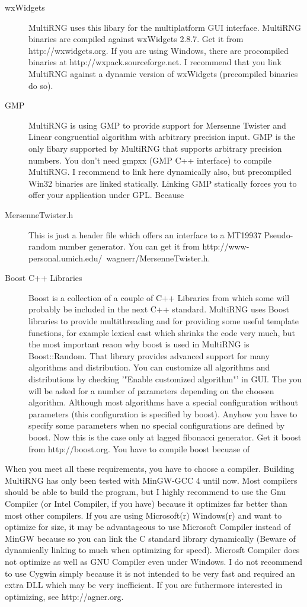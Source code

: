 \documentclass{scrartcl}
\begin{document}
\begin{description}
\item[wxWidgets]MultiRNG uses this libary for the multiplatform GUI interface. MultiRNG binaries are compiled against wxWidgets 2.8.7. Get it from http://wxwidgets.org. If you are using Windows, there are procompiled binaries at http://wxpack.sourceforge.net. I recommend that you link MultiRNG against a dynamic version of wxWidgets (precompiled binaries do so).
\item[GMP]MultiRNG is using GMP to provide support for Mersenne Twister and Linear congruential algorithm with arbitrary precision input. GMP is the only libary supported by MultiRNG that supports arbitrary precision numbers. You don't need gmpxx (GMP C++ interface) to compile MultiRNG. I recommend to link here dynamically also, but precompiled Win32 binaries are linked statically. Linking GMP statically forces you to offer your application under GPL. Because 
\item[MersenneTwister.h]This is just a header file which offers an interface to a MT19937 Pseudo-random number generator. You can get it from http://www-personal.umich.edu/~wagnerr/MersenneTwister.h.
\item[Boost C++ Libraries]Boost is a collection of a couple of C++ Libraries from which some will probably be included in the next C++ standard. MultiRNG uses Boost libraries to provide multithreading and for providing some useful template functions, for example lexical cast which shrinks the code very much, but the most important reaon why boost is used in MultiRNG is Boost::Random. That library provides advanced support for many algorithms and distribution. You can customize all algorithms and distributions by checking '"Enable customized algorithm"' in GUI. The you will be asked for a number of parameters depending on the choosen algorithm. Although most algorithms have a special configuration without parameters (this configuration is specified by boost). Anyhow you have to specify some parameters when no special configurations are defined by boost. Now this is the case only at lagged fibonacci generator. Get it boost from http://boost.org. You have to compile boost becuase of 
\end{description}
When you meet all these requirements, you have to choose a compiler. Building MultiRNG has only been tested with MinGW-GCC 4 until now. Most compilers should be able to build the program, but I highly recommend to use the Gnu Compiler (or Intel Compiler, if you have) because it optimizes far better than most other compilers. If you are using Microsoft(r) Windows(r) and want to optimize for size, it may be advantageous to use Microsoft Compiler instead of MinGW because so you can link the C standard library dynamically (Beware of dynamically linking to much when optimizing for speed). Microsft Compiler does not optimize as well as GNU Compiler even under Windows. I do not recommend to use Cygwin simply because it is not intended to be very fast and required an extra DLL which may be very inefficient. If you are futhermore interested in optimizing, see http://agner.org.\newline
\end{document}
